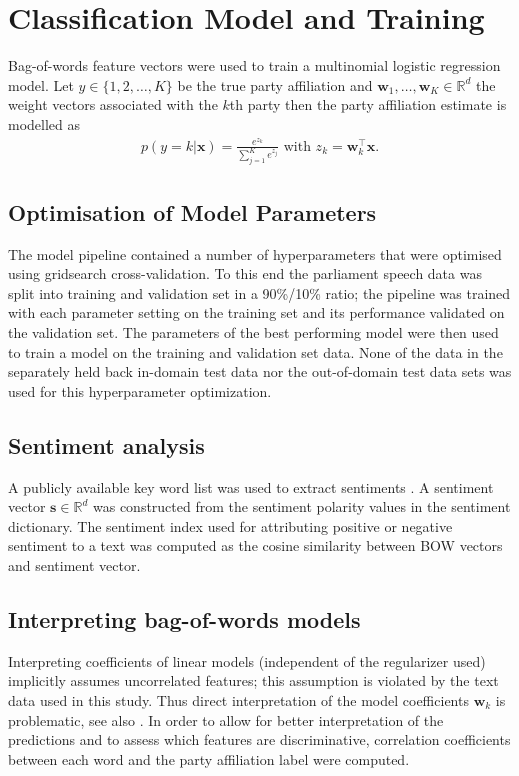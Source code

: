 \documentclass[11pt]{article}
\renewcommand{\vec}[1]{\mathbf{#1}}
\newcommand{\R}{\mathds{R}}
\begin{document}
\section{Classification Model and Training}\label{sec:model}
Bag-of-words feature vectors were used to train a multinomial logistic regression model. Let $y\in\{1,2,\dots,K\}$ be the true party affiliation and $\vec{w}_1,\dots,\vec{w}_K\in\R^{d}$ the weight vectors associated with the $k$th party then the party affiliation estimate is modelled as
\begin{eqnarray}\label{eq:logreg_multiclass}
p(y=k|\vec{x}) = \frac{e^{z_k}}{\sum_{j=1}^K e^{z_j}}  \textrm{ with }  z_k=\vec{w}_k^{\top}\vec{x}.
\end{eqnarray}

\subsection{Optimisation of Model Parameters}\label{sec:crossvalidation}
The model pipeline contained a number of  hyperparameters that were optimised using gridsearch cross-validation. To this end the parliament speech data was split into training and validation set in a 90\%/10\% ratio; the pipeline was trained with each parameter setting on the training set and its performance validated on the validation set. The parameters of the best performing model were then used to train a model on the training and validation set data. None of the data in the separately held back in-domain test data nor the out-of-domain test data sets was used for this hyperparameter optimization. 
%
\subsection{Sentiment analysis}\label{sec:sentiment_analysis_methods}
A publicly available key word list was used to extract sentiments \cite{remquahey2010}. A sentiment vector $\vec{s}\in\R^d$ was constructed from the sentiment polarity values in the sentiment dictionary. The sentiment index used for attributing positive or negative sentiment to a text was computed as the cosine similarity between BOW vectors and sentiment vector.

\subsection{Interpreting bag-of-words models}\label{sec:correlations_methods}
Interpreting coefficients of linear models (independent of the regularizer used) implicitly assumes uncorrelated features; this assumption is violated by the text data used in this study. Thus direct interpretation of the model coefficients $\vec{w}_k$ is problematic, see also \cite{Zien2009, Haufe2013}. In order to allow for better interpretation of the predictions and to assess which features are discriminative, correlation coefficients between each word and the party affiliation label were computed. 
\end{document}
